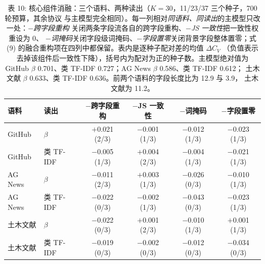 \documentclass{article}
\begin{document}
\label{sec:core-ablation}

\begin{table}[t]
\centering
\caption{表 10: 核心组件消融：三个语料、两种读出（$K=30$，11/23/37 三个种子，700 轮预算，其余协议
与主模型完全相同）。每一列相对\emph{同语料、同读出}的主模型只改一处：\emph{$-$跨字段重构}
关闭两条字段流各自的跨字段重构、\emph{$-$JS 一致性}把一致性权重设为 $0$、
\emph{$-$词掩码}关闭字段级词掩码、\emph{$-$字段置零}关闭背景字段整体置零；式
(9) 的融合重构项在四列中都保留。表内是逐种子配对差的均值 $\Delta C_V$
（负值表示去掉该组件后一致性下降），括号内为配对为正的种子数。主模型绝对值为
GitHub $\beta$ 0.701、类 TF-IDF 0.727；AG News $\beta$ 0.586、类 TF-IDF 0.612；
土木文献 $\beta$ 0.633、类 TF-IDF 0.636。前两个语料的字段长度比为 12.9 与 3.9，
土木文献为 11.2。}
\label{tab:core-ablation}
\small
\setlength{\tabcolsep}{5pt}
\begin{tabular}{llcccc}
\toprule
语料 & 读出 & $-$跨字段重构 & $-$JS 一致性 & $-$词掩码 & $-$字段置零 \\
\midrule
GitHub & $\beta$ & $+$0.021 (2/3) & $-$0.001 (1/3) & $-$0.012 (1/3) & $-$0.023 (1/3) \\
GitHub & 类 TF-IDF & $-$0.005 (1/3) & $+$0.004 (2/3) & $-$0.004 (1/3) & $-$0.021 (1/3) \\
\midrule
AG News & $\beta$ & $-$0.011 (2/3) & $+$0.003 (1/3) & $-$0.026 (0/3) & $-$0.010 (1/3) \\
AG News & 类 TF-IDF & $-$0.022 (0/3) & $-$0.002 (1/3) & $-$0.043 (0/3) & $-$0.023 (1/3) \\
\midrule
土木文献 & $\beta$ & $-$0.022 (0/3) & $+$0.001 (2/3) & $-$0.010 (1/3) & $+$0.001 (1/3) \\
土木文献 & 类 TF-IDF & $-$0.019 (0/3) & $-$0.002 (0/3) & $-$0.012 (0/3) & $-$0.034 (0/3) \\
\bottomrule
\end{tabular}
\end{table}
\end{document}

